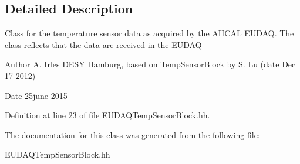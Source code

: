 \subsection{Detailed Description}
Class for the temperature sensor data as acquired by the AHCAL EUDAQ. The class reflects that the data are received in the EUDAQ \begin{DoxyAuthor}{Author}
A. Irles DESY Hamburg, based on TempSensorBlock by S. Lu (date Dec 17 2012) 
\end{DoxyAuthor}
\begin{DoxyDate}{Date}
25june 2015 
\end{DoxyDate}


Definition at line 23 of file EUDAQTempSensorBlock.hh.

The documentation for this class was generated from the following file:\begin{DoxyCompactItemize}
\item 
EUDAQTempSensorBlock.hh\end{DoxyCompactItemize}
